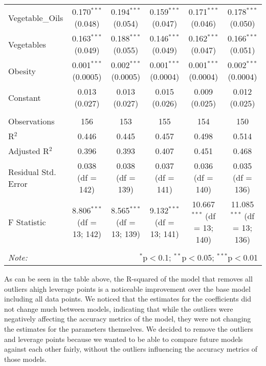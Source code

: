 \documentclass[
]{article}
\begin{document}
\begin{table}[!htbp]
\begin{tabular}{@{\extracolsep{-15pt}}lccccc}
  Vegetable\_Oils & 0.170$^{***}$ (0.048) & 0.194$^{***}$ (0.054) & 0.159$^{***}$ (0.047) & 0.171$^{***}$ (0.046) & 0.178$^{***}$ (0.050) \\ 
  Vegetables & 0.163$^{***}$ (0.049) & 0.188$^{***}$ (0.055) & 0.146$^{***}$ (0.049) & 0.162$^{***}$ (0.047) & 0.166$^{***}$ (0.051) \\ 
  Obesity & 0.001$^{***}$ (0.0005) & 0.002$^{***}$ (0.0005) & 0.001$^{***}$ (0.0004) & 0.001$^{***}$ (0.0004) & 0.002$^{***}$ (0.0004) \\ 
  Constant & 0.013 (0.027) & 0.013 (0.027) & 0.015 (0.026) & 0.009 (0.025) & 0.012 (0.025) \\ 
 \hline \\[-1.8ex] 
Observations & 156 & 153 & 155 & 154 & 150 \\ 
R$^{2}$ & 0.446 & 0.445 & 0.457 & 0.498 & 0.514 \\ 
Adjusted R$^{2}$ & 0.396 & 0.393 & 0.407 & 0.451 & 0.468 \\ 
Residual Std. Error & 0.038 (df = 142) & 0.038 (df = 139) & 0.037 (df = 141) & 0.036 (df = 140) & 0.035 (df = 136) \\ 
F Statistic & 8.806$^{***}$ (df = 13; 142) & 8.565$^{***}$ (df = 13; 139) & 9.132$^{***}$ (df = 13; 141) & 10.667$^{***}$ (df = 13; 140) & 11.085$^{***}$ (df = 13; 136) \\ 
\hline 
\hline \\[-1.8ex] 
\textit{Note:}  & \multicolumn{5}{r}{$^{*}$p$<$0.1; $^{**}$p$<$0.05; $^{***}$p$<$0.01} \\ 
\end{tabular} 
\end{table}

As can be seen in the table above, the R-squared of the model that
removes all outliers ahigh leverage points is a noticeable improvement
over the base model including all data points. We noticed that the
estimates for the coefficients did not change much between models,
indicating that while the outliers were negatively affecting the
accuracy metrics of the model, they were not changing the estimates for
the parameters themselves. We decided to remove the outliers and
leverage points because we wanted to be able to compare future models
against each other fairly, without the outliers influencing the accuracy
metrics of those models.
\end{document}
